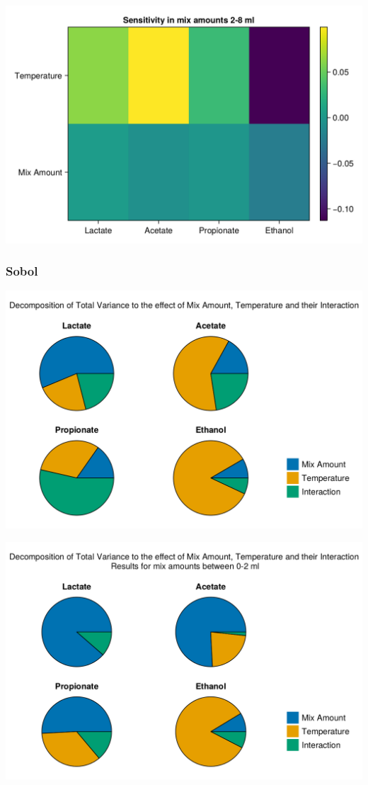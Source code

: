 \documentclass[11pt]{article}
\begin{document}
\begin{center}
\includegraphics[width=.9\linewidth]{../plots/sensitivity/morris_high.png}
\end{center}

\subsubsection{Sobol}
\label{sec:org5673a85}
\begin{center}
\includegraphics[width=.9\linewidth]{../plots/sensitivity/global_sobol.png}
\end{center}

\begin{center}
\includegraphics[width=.9\linewidth]{../plots/sensitivity/low_sobol.png}
\end{center}
\end{document}
